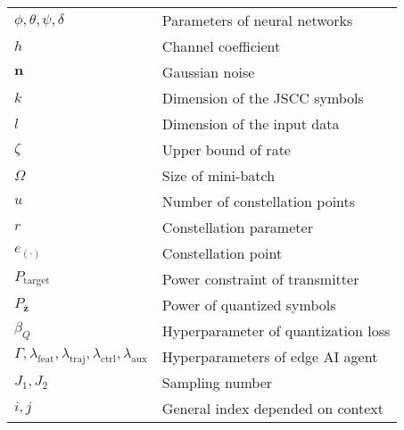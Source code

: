 \begin{table}
\begin{tabular}{ll}
$\phi, \theta, \psi, \delta$                                                                & Parameters of neural networks              \\
$h$                                                                                         & Channel coefficient                        \\
$\bm{n}$                                                                                    & Gaussian noise                             \\
$k$                                                                                         & Dimension of the JSCC symbols              \\
$l$                                                                                         & Dimension of the input data                \\
$\zeta$                                                                                     & Upper bound of rate                        \\
$\Omega$                                                                                    & Size of mini-batch                         \\
$u$                                                                                         & Number of constellation points             \\
$r$                                                                                         & Constellation parameter                    \\
$e_{\left( \cdot \right)}$                                                                    & Constellation point                        \\
$P_\text{target}$                                                                           & Power constraint of transmitter            \\
$P_{\bar{\bm{z}}}$                                                                            & Power of quantized symbols                 \\
$\beta_Q$                                                                                   & Hyperparameter of quantization loss        \\
$\Gamma, \lambda_\text{feat}, \lambda_\text{traj}, \lambda_\text{ctrl}, \lambda_\text{aux}$ & Hyperparameters of edge AI agent           \\
$J_1, J_2$                                                                                  & Sampling number                            \\
$i, j$                                                                                      & General index depended on context  \\
\bottomrule
\end{tabular}
\end{table}